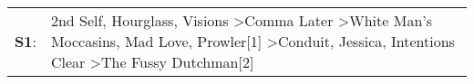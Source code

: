 \begin{supertabular}{p{0.03\textwidth}p{0.92\textwidth}}
 \textbf{S1}:  &  2nd Self\textsuperscript{}, \enspace Hourglass\textsuperscript{}, \enspace Visions\textsuperscript{} \textgreater \enspace Comma Later\textsuperscript{} \textgreater \enspace White Man's Moccasins\textsuperscript{}, \enspace Mad Love\textsuperscript{}, \enspace Prowler[1]\textsuperscript{} \textgreater \enspace Conduit\textsuperscript{}, \enspace Jessica\textsuperscript{}, \enspace Intentions Clear\textsuperscript{} \textgreater \enspace The Fussy Dutchman[2]\textsuperscript{}  \enspace  \\
\end{supertabular}

